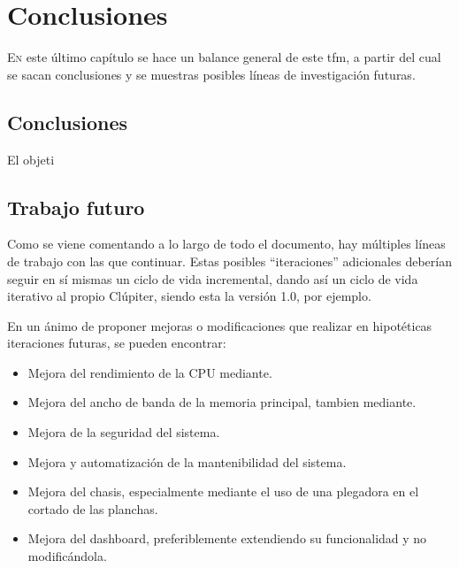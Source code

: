 \chapter{Conclusiones}
\label{chap:conclusiones}

\lettrine{E}{n} este último capítulo se hace un balance general de este \acrlong{tfm}, a partir del cual se sacan conclusiones y se muestras posibles líneas de investigación futuras.

\section{Conclusiones}
El objeti

\section{Trabajo futuro}
Como se viene comentando a lo largo de todo el documento, hay múltiples líneas de trabajo con las que continuar. Estas posibles ``iteraciones'' adicionales deberían seguir en sí mismas un ciclo de vida incremental, dando así un ciclo de vida iterativo al propio Clúpiter, siendo esta la versión 1.0, por ejemplo.

En un ánimo de proponer mejoras o modificaciones que realizar en hipotéticas iteraciones futuras, se pueden encontrar:
\begin{itemize}
    \item Mejora del rendimiento de la CPU mediante.
    \item Mejora del ancho de banda de la memoria principal, tambien mediante.
    \item Mejora de la seguridad del sistema.
    \item Mejora y automatización de la mantenibilidad del sistema.
    \item Mejora del chasis, especialmente mediante el uso de una plegadora en el cortado de las planchas.
    \item Mejora del dashboard, preferiblemente extendiendo su funcionalidad y no modificándola.
\end{itemize}
